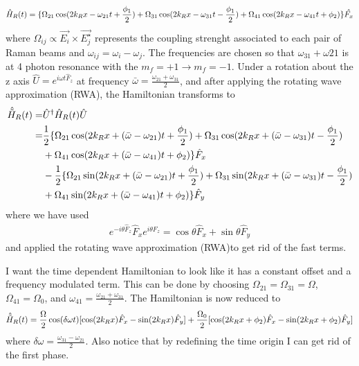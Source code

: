 %
\begin{align}
	\hat{H}_R(t) = \lbrace\Omega_{21}\cos(2{{k_R}} x-\omega_{21} t +\frac{\phi_1}{2})+\Omega_{31}\cos(2{{k_R}} x-\omega_{31} t-\frac{\phi_1}{2})+\Omega_{41}\cos(2{{k_R}} x-\omega_{41} t + \phi_2)\rbrace\hat{F_x}
\end{align}
%
%
where $\Omega_{ij}\propto \vec{E_i}\times\vec{E_j^{\star}}$ represents the coupling strenght associated to each pair of Raman beams and $\omega_{ij} = \omega_{i}-\omega_{j} $. The frequencies are chosen so that $\omega_{31} + \omega{21}$ is at 4 photon resonance with the $m_f = +1\rightarrow m_f = -1$. Under a rotation about the z axis $\hat{U} = e^{i\omega t\hat{F}_z}$ at frequency $\bar{\omega} = \frac{\omega_{21}+\omega_{31}}{2}$, and after applying the rotating wave approximation (RWA), the Hamiltonian transforms to 
%
%
\begin{align}
	\begin{split}
		\hat{\tilde{H}}_R(t) = & \hat{U}^{\dagger} \hat{H}_R(t)\hat{U} \\
		= & \frac{1}{2}\lbrace\Omega_{21}\cos(2{{k_R}} x+(\bar{\omega}-\omega_{21}) t +\frac{\phi_1}{2})+\Omega_{31}\cos(2{{k_R}} x+(\bar{\omega}-\omega_{31}) t -\frac{\phi_1}{2}) \\
		& +\Omega_{41}\cos(2{{k_R}} x+(\bar{\omega}-\omega_{41}) t + \phi_2)\rbrace \hat{F}_x \\
		& -  \frac{1}{2}\lbrace\Omega_{21}\sin(2{{k_R}} x+(\bar{\omega}-\omega_{21}) t +\frac{\phi_1}{2})+\Omega_{31}\sin(2{{k_R}} x+(\bar{\omega}-\omega_{31}) t-\frac{\phi_1}{2})\\
		&+\Omega_{41}\sin(2{{k_R}} x+(\bar{\omega}-\omega_{41}) t+\phi_2)\rbrace \hat{F}_y
	\end{split}
\end{align}
%
%
where we have used 
%
\begin{align}
	e^{-i\theta \hat{F}_z} \hat{F}_x e^{i\theta \hat{F}_z}= \cos\theta \hat{F}_x + \sin\theta\hat{F}_y
\end{align}
%
and applied the rotating wave approximation (RWA)to get rid of the fast terms. 

I want the time dependent Hamiltonian to look like it has a constant offset and a frequency modulated term. This can be done by choosing $\Omega_{21} =\Omega_{31} = \Omega $, $\Omega_{41}=\Omega_0$, and $\omega_{41} =\frac{\omega_{21}+\omega_{31}}{2}$. The Hamiltonian is now reduced to 
%
%
\begin{align}
	\begin{split}
		\hat{\tilde{H}}_R(t) = \frac{\Omega}{2}\cos(\delta\omega t)[\cos(2{{k_R}} x)\hat{F}_x - \sin(2{{k_R}} x)\hat{F}_y] + \frac{\Omega_{0}}{2}[\cos(2{{k_R}} x + \phi_2)\hat{F}_x - \sin(2{{k_R}} x + \phi_2)\hat{F}_y] \\
	\end{split}
\end{align}
%
%
where $\delta\omega=\frac{\omega_{31}-\omega_{21}}{2}$. Also notice that by redefining the time origin I can get rid of the first phase. 


